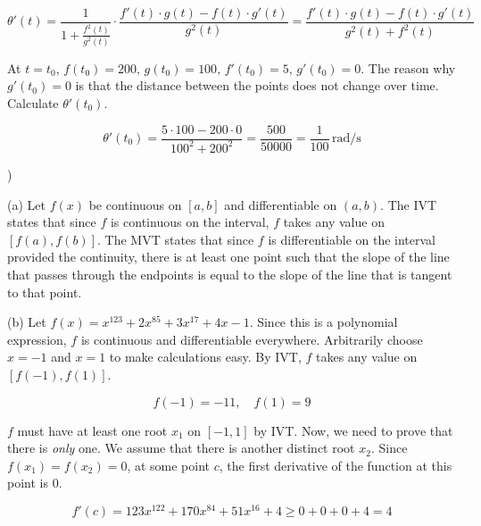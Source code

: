\documentclass{article}
\begin{document}
\begin{equation*}\theta'(t)=\frac1{\displaystyle 1+\frac{f^2(t)}{g^2(t)}}\cdot\frac{f'(t)\cdot g(t) - f(t) \cdot g'(t)}{g^2(t)}=\frac{f'(t)\cdot g(t) - f(t) \cdot g'(t)}{g^2(t)+f^2(t)}\end{equation*}

\hfill

\noindent At $t=t_0$, $f(t_0)= 200,\,g(t_0) =100,\,f'(t_0)=5,\,g'(t_0) = 0$. The reason why $g'(t_0) = 0$ is that the distance between the points does not change over time. Calculate $\theta'(t_0)$.

\begin{equation*}\theta'(t_0)=\frac{5\cdot 100 - 200 \cdot 0}{100^2+200^2}=\frac{500}{50000}=\boxed{\frac1{100}\,\mathrm{rad/s}} \end{equation*}

\hfill

)

\hfill

\noindent (a) Let $f(x)$ be continuous on $[a,b]$ and differentiable on $(a,b)$. The IVT states that since $f$ is continuous on the interval, $f$ takes any value on $[f(a), f(b)]$. The MVT states that since $f$ is differentiable on the interval provided the continuity, there is at least one point such that the slope of the line that passes through the endpoints is equal to the slope of the line that is tangent to that point.

\hfill

\noindent (b) Let $f(x) = x^{123}+2x^{85} + 3x^{17} + 4x-1$. Since this is a polynomial expression, $f$ is continuous and differentiable everywhere. Arbitrarily choose $x=-1$ and $x=1$ to make calculations easy. By IVT, $f$ takes any value on $[f(-1), f(1)]$.

\begin{equation*}f(-1) = -11,\quad f(1) =9\end{equation*}

\hfill

\noindent $f$ must have at least one root $x_1$ on $[-1, 1]$ by IVT. Now, we need to prove that there is \textit{only} one. We assume that there is another distinct root $x_2$. Since $f(x_1) = f(x_2) = 0$, at some point $c$, the first derivative of the function at this point is $0$.

\begin{equation*}f'(c) = 123x^{122}+170x^{84} + 51x^{16} + 4 \geq 0+ 0+ 0+ 4 = 4\end{equation*}
\end{document}
